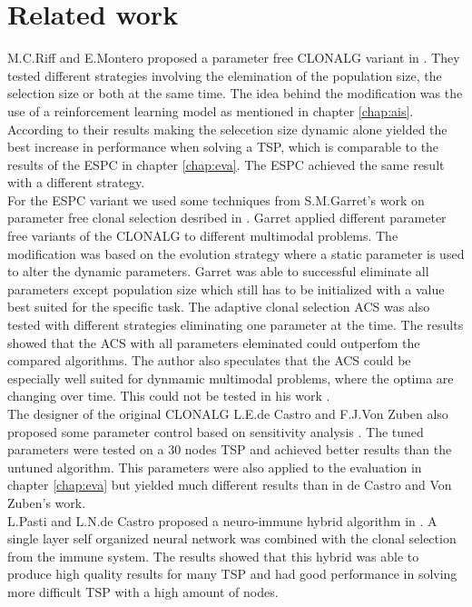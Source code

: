 \chapter{Related work}
\label{chap:rlw}
M.C.Riff and E.Montero proposed a parameter free CLONALG variant in \cite{RIFF09}. They tested different strategies involving the elemination of the population size, the selection size or both at the same time. The idea behind the modification was the use of a reinforcement learning model as mentioned in chapter \ref{chap:ais}. According to their results making the selecetion size dynamic alone yielded the best increase in performance when solving a TSP, which is comparable to the results of the ESPC in chapter \ref{chap:eva}. The ESPC achieved the same result with a different strategy.\\
For the ESPC variant we used some techniques from S.M.Garret's work on parameter free clonal selection desribed in \cite{Garret04}. Garret applied different parameter free variants of the CLONALG to different multimodal problems. The modification was based on the evolution strategy where a static parameter is used to alter the dynamic parameters. Garret was able to successful eliminate all parameters except population size which still has to be initialized with a value best suited for the specific task. The adaptive clonal selection ACS was also tested with different strategies eliminating one parameter at the time. The results showed that the ACS with all parameters eleminated could outperfom the compared algorithms. The author also speculates that the ACS could be especially well suited for dynmamic multimodal problems, where the optima are changing over time. This could not be tested in his work \cite{Garret04}.\\
The designer of the original CLONALG L.E.de Castro and F.J.Von Zuben also proposed some parameter control based on sensitivity analysis \cite{DEC02}. The tuned parameters were tested on a 30 nodes TSP and achieved better results than the untuned algorithm. This parameters were also applied to the evaluation in chapter \ref{chap:eva} but yielded much different results than in de Castro and Von Zuben's work.\\
L.Pasti and L.N.de Castro proposed a neuro-immune hybrid algorithm in \cite{Pasti06}. A single layer self organized neural network was combined with the clonal selection from the immune system. The results showed that this hybrid was able to produce high quality results for many TSP and had good performance in solving more difficult TSP with a high amount of nodes. 